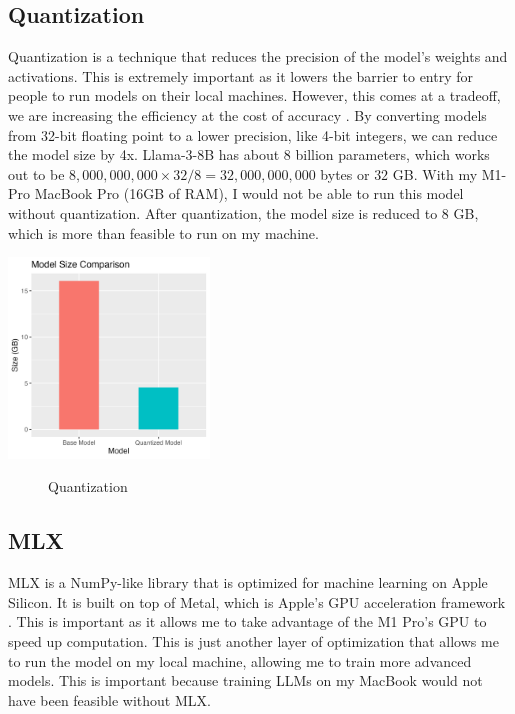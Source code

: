 \documentclass[12pt]{article}
\begin{document}
\subsection{Quantization}
Quantization is a technique that reduces the precision of the model's weights and activations. This is extremely important as it lowers the barrier to entry for people to run models on their local machines. However, this comes at a tradeoff, we are increasing the efficiency at the cost of accuracy \cite{wenqi}. By converting models from 32-bit floating point to a lower precision, like 4-bit integers, we can reduce the model size by 4x. Llama-3-8B has about 8 billion parameters, which works out to be $8,000,000,000 \times 32 / 8 = 32,000,000,000$ bytes or $32$ GB. With my M1-Pro MacBook Pro (16GB of RAM), I would not be able to run this model without quantization. After quantization, the model size is reduced to $8$ GB, which is more than feasible to run on my machine.
\begin{center}
    \includegraphics[width=0.4\textwidth]{../Visuals/ModelSize.png}
    \begin{figure}[H]
        \caption{Quantization}
    \end{figure}
\end{center}

\subsection{MLX}
MLX is a NumPy-like library that is optimized for machine learning on Apple Silicon. It is built on top of Metal, which is Apple's GPU acceleration framework \cite{mlx2023}. This is important as it allows me to take advantage of the M1 Pro's GPU to speed up computation. This is just another layer of optimization that allows me to run the model on my local machine, allowing me to train more advanced models. This is important because training LLMs on my MacBook would not have been feasible without MLX.
\end{document}
